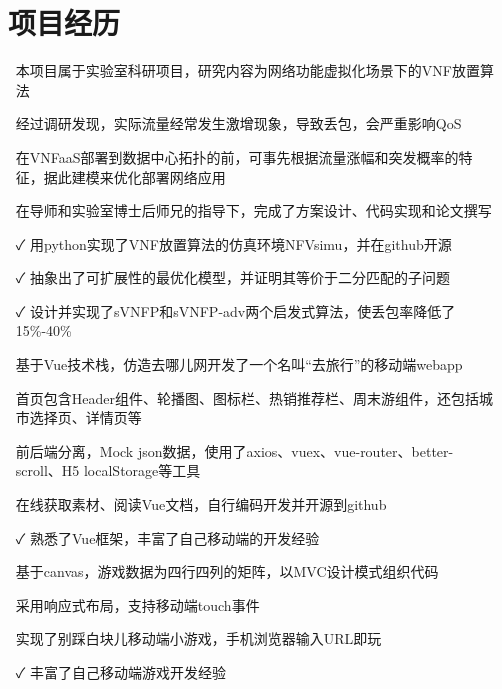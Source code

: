 \documentclass[14pt]{resume}
\begin{document}
\section{\faUsers\ 项目经历}

\begin{onehalfspacing}
\begin{itemize}
    \item[\faFlagO] 本项目属于实验室科研项目，研究内容为网络功能虚拟化场景下的VNF放置算法
    \item[\faFlagO] 经过调研发现，实际流量经常发生激增现象，导致丢包，会严重影响QoS
    \item[\faFlagO] 在VNFaaS部署到数据中心拓扑的前，可事先根据流量涨幅和突发概率的特征，据此建模来优化部署网络应用
    \item[\faCode] 在导师和实验室博士后师兄的指导下，完成了方案设计、代码实现和论文撰写
    \item[\faCheck] 用python实现了VNF放置算法的仿真环境NFVsimu，并在github开源
    \item[\faCheck] 抽象出了可扩展性的最优化模型，并证明其等价于二分匹配的子问题
    \item[\faCheck] 设计并实现了sVNFP和sVNFP-adv两个启发式算法，使丢包率降低了15\%-40\%
\end{itemize}
\end{onehalfspacing}

\begin{onehalfspacing}
\begin{itemize}
    \item[\faFlagO] 基于Vue技术栈，仿造去哪儿网开发了一个名叫“去旅行”的移动端webapp
    \item[\faFlagO] 首页包含Header组件、轮播图、图标栏、热销推荐栏、周末游组件，还包括城市选择页、详情页等
    \item[\faFlagO] 前后端分离，Mock json数据，使用了axios、vuex、vue-router、better-scroll、H5 localStorage等工具
    \item[\faCode] 在线获取素材、阅读Vue文档，自行编码开发并开源到github
    \item[\faCheck] 熟悉了Vue框架，丰富了自己移动端的开发经验
\end{itemize}
\end{onehalfspacing}

\begin{onehalfspacing}
\begin{itemize}
    \item[\faFlagO] 基于canvas，游戏数据为四行四列的矩阵，以MVC设计模式组织代码
    \item[\faFlagO] 采用响应式布局，支持移动端touch事件
    \item[\faCode] 实现了别踩白块儿移动端小游戏，手机浏览器输入URL即玩
    \item[\faCheck] 丰富了自己移动端游戏开发经验
\end{itemize}
\end{onehalfspacing}
\end{document}

